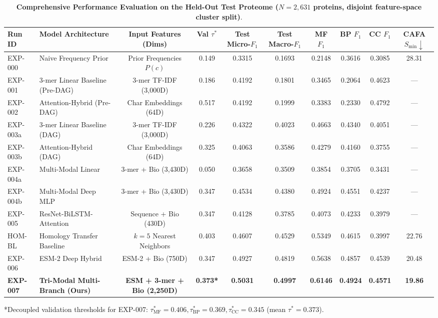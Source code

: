 \documentclass[twocolumn,10pt]{article}
\begin{document}
\begin{table}[t]
\centering
\caption{\textbf{Comprehensive Performance Evaluation on the Held-Out Test Proteome ($N=2,631$ proteins, disjoint feature-space cluster split)}.}
\label{tab:main_results}
\begin{adjustbox}{width=\textwidth}
\begin{tabular}{llcccccccc}
\toprule
\textbf{Run ID} & \textbf{Model Architecture} & \textbf{Input Features (Dims)} & \textbf{Val $\tau^*$} & \textbf{Test Micro-$F_1$} & \textbf{Test Macro-$F_1$} & \textbf{MF $F_1$} & \textbf{BP $F_1$} & \textbf{CC $F_1$} & \textbf{CAFA $S_{\min} \downarrow$} \\
\midrule
EXP-000 & Naive Frequency Prior & Prior Frequencies $P(c)$ & 0.149 & 0.3315 & 0.1693 & 0.2148 & 0.3616 & 0.3085 & 28.31 \\
EXP-001 & 3-mer Linear Baseline (Pre-DAG) & 3-mer TF-IDF (3,000D) & 0.186 & 0.4192 & 0.1801 & 0.3465 & 0.2064 & 0.4623 & --- \\
EXP-002 & Attention-Hybrid (Pre-DAG) & Char Embeddings (64D) & 0.517 & 0.4192 & 0.1999 & 0.3383 & 0.2330 & 0.4792 & --- \\
EXP-003a & 3-mer Linear Baseline (DAG) & 3-mer TF-IDF (3,000D) & 0.226 & 0.4322 & 0.4023 & 0.4663 & 0.4340 & 0.4051 & --- \\
EXP-003b & Attention-Hybrid (DAG) & Char Embeddings (64D) & 0.325 & 0.4063 & 0.3586 & 0.4279 & 0.4160 & 0.3755 & --- \\
EXP-004a & Multi-Modal Linear & 3-mer + Bio (3,430D) & 0.050 & 0.3658 & 0.3509 & 0.3854 & 0.3705 & 0.3431 & --- \\
EXP-004b & Multi-Modal Deep MLP & 3-mer + Bio (3,430D) & 0.347 & 0.4534 & 0.4380 & 0.4924 & 0.4551 & 0.4237 & --- \\
EXP-005 & ResNet-BiLSTM-Attention & Sequence + Bio (430D) & 0.347 & 0.4128 & 0.3785 & 0.4073 & 0.4233 & 0.3979 & --- \\
HOM-BL & Homology Transfer Baseline & $k=5$ Nearest Neighbors & 0.403 & 0.4607 & 0.4529 & 0.5349 & 0.4615 & 0.3997 & 22.76 \\
EXP-006 & ESM-2 Deep Hybrid & ESM-2 + Bio (750D) & 0.347 & 0.4927 & 0.4819 & 0.5638 & 0.4857 & 0.4539 & 20.48 \\
\textbf{EXP-007} & \textbf{Tri-Modal Multi-Branch (Ours)} & \textbf{ESM + 3-mer + Bio (2,250D)} & \textbf{0.373*} & \textbf{0.5031} & \textbf{0.4997} & \textbf{0.6146} & \textbf{0.4924} & \textbf{0.4571} & \textbf{19.86} \\
\bottomrule
\end{tabular}
\end{adjustbox}
\vspace{1mm}
\footnotesize{*Decoupled validation thresholds for EXP-007: $\tau^*_{\text{MF}} = 0.406, \tau^*_{\text{BP}} = 0.369, \tau^*_{\text{CC}} = 0.345$ (mean $\tau^* = 0.373$).}
\end{table}
\end{document}
